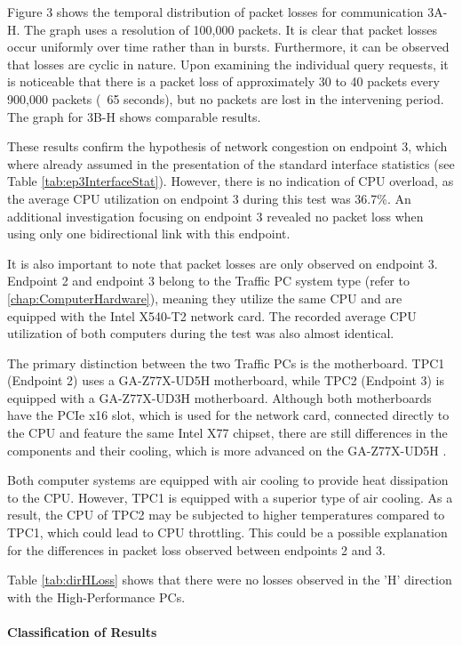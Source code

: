Figure 3 shows the temporal distribution of packet losses for communication 3A-H. The graph uses a resolution of 100,000 packets.  It is clear that packet losses occur uniformly over time rather than in bursts. Furthermore, it can be observed that losses are cyclic in nature. Upon examining the individual query requests, it is noticeable that there is a packet loss of approximately 30 to 40 packets every 900,000 packets (~65 seconds), but no packets are lost in the intervening period. The graph for 3B-H shows comparable results.

These results confirm the hypothesis of network congestion on endpoint 3, which where already assumed in the presentation of the standard interface statistics (see Table \ref{tab:ep3InterfaceStat}). However, there is no indication of CPU overload, as the average CPU utilization on endpoint 3 during this test was 36.7\%. An additional investigation focusing on endpoint 3 revealed no packet loss when using only one bidirectional link with this endpoint.

It is also important to note that packet losses are only observed on endpoint 3. Endpoint 2 and endpoint 3 belong to the Traffic PC system type (refer to \ref{chap:ComputerHardware}), meaning they utilize the same CPU and are equipped with the Intel X540-T2 network card. The recorded average CPU utilization of both computers during the test  was also almost identical.

The primary distinction between the two Traffic PCs is the motherboard. TPC1 (Endpoint 2) uses a GA-Z77X-UD5H motherboard, while TPC2 (Endpoint 3) is equipped with a GA-Z77X-UD3H motherboard. Although both motherboards have the PCIe x16 slot, which is used for the network card, connected directly to the CPU and feature the same Intel X77 chipset, there are still differences in the components and their cooling, which is more advanced on the GA-Z77X-UD5H \cite{reli04, reli05}.

Both computer systems are equipped with air cooling to provide heat dissipation to the CPU. However, TPC1 is equipped with a superior type of air cooling. As a result, the CPU of TPC2 may be subjected to higher temperatures compared to TPC1, which could lead to CPU throttling. This could be a possible explanation for the differences in packet loss observed between endpoints 2 and 3.

Table \ref{tab:dirHLoss} shows that there were no losses observed in the 'H' direction with the High-Performance PCs.

\paragraph{Classification of Results}

